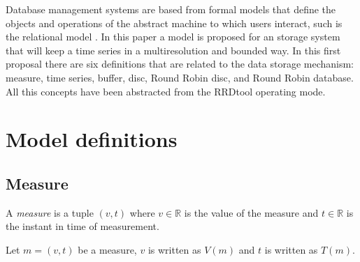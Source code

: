 Database management systems are based from formal models that define
the objects and operations of the abstract machine to which users
interact, such is the relational model \parencite{date}. In this paper
a model is proposed for an storage system that will keep a time series
in a multiresolution and bounded way.  In this first proposal there
are six definitions that are related to the data storage mechanism:
measure, time series, buffer, disc, Round Robin disc, and Round Robin
database. All this concepts have been abstracted from the RRDtool
operating mode.




\section{Model definitions}

\subsection{Measure}

\begin{definition}[Measure]
  \label{def:measure}
  A \emph{measure} is a tuple $(v,t)$ where $v\in{\mathbb{R}}$ is the
  value of the measure and $t \in \mathbb{R}$ is the instant in time
  of measurement.
\end{definition}

Let $m=(v,t)$ be a measure, $v$ is written as $V(m)$ and $t$
is written as $T(m)$.




